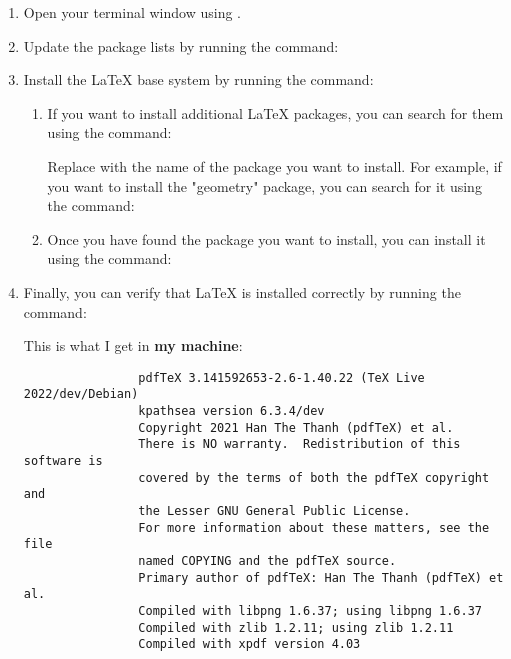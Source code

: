 \documentclass[12pt]{article}
\begin{document}
	\begin{enumerate}
		\item Open your terminal window using .
		\item Update the package lists by running the command:
		
		
		\item Install the LaTeX base system by running the command:
		
		
		\begin{enumerate}
			\item If you want to install additional LaTeX packages, you can search for them using the command:
			
			
			Replace with the name of the package you want to install. For example, if you want to install the "geometry" package, you can search for it using the command:
			
			
			\item Once you have found the package you want to install, you can install it using the command:
			
		\end{enumerate}
	    
	    \item Finally, you can verify that LaTeX is installed correctly by running the command:
	    
	    
	    This is what I get in \textbf{my machine}:
	    
	    \begin{mdframed}[style=myboxstyleTerminal1]
	    	\begin{verbatim}
	    		pdfTeX 3.141592653-2.6-1.40.22 (TeX Live 2022/dev/Debian)
	    		kpathsea version 6.3.4/dev
	    		Copyright 2021 Han The Thanh (pdfTeX) et al.
	    		There is NO warranty.  Redistribution of this software is
	    		covered by the terms of both the pdfTeX copyright and
	    		the Lesser GNU General Public License.
	    		For more information about these matters, see the file
	    		named COPYING and the pdfTeX source.
	    		Primary author of pdfTeX: Han The Thanh (pdfTeX) et al.
	    		Compiled with libpng 1.6.37; using libpng 1.6.37
	    		Compiled with zlib 1.2.11; using zlib 1.2.11
	    		Compiled with xpdf version 4.03
	    	\end{verbatim}
	    \end{mdframed} 
	\end{enumerate}
\end{document}
